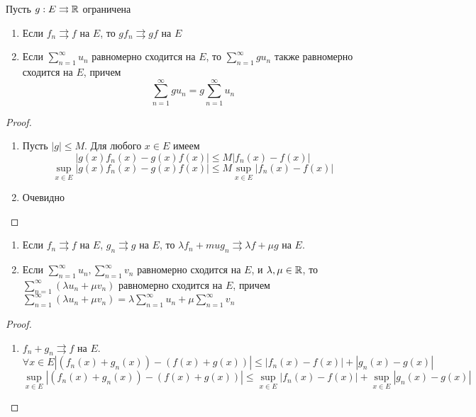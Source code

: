 \begin{proposition}
  Пусть \(g: E \rightrightarrows \mathbb{R}\) ограничена
  \begin{enumerate}
    \item Если  \(f_n \rightrightarrows f\) на \(E\), то \(gf_n \rightrightarrows gf\) на \(E\)
    \item Если \(\sum_{n = 1}^\infty u_n\) равномерно сходится на \(E\), то \(\sum_{n = 1}^\infty gu_n\) также равномерно сходится на \(E\), причем 
    \[\sum_{n = 1}^\infty gu_n = g\sum_{n = 1}^\infty u_n\]
  \end{enumerate}
\end{proposition}
\begin{proof}\indent
  \begin{enumerate}
    \item Пусть \(|g| \le M\). Для любого \(x \in E\) имеем
    \[|g(x)f_n(x) - g(x)f(x)| \le M|f_n(x) - f(x)|\]
    \[\sup_{x \in E}|g(x)f_n(x) - g(x)f(x)| \le M\sup_{x \in E}|f_n(x) - f(x)|\]
    \item Очевидно
  \end{enumerate}
\end{proof}
\begin{proposition}\indent
  \begin{enumerate}
    \item Если \(f_n \rightrightarrows f\) на \(E\), \(g_n \rightrightarrows g\) на \(E\), то \(\lambda f_n + 
    mu g_n \rightrightarrows \lambda f + \mu g\) на \(E\).
    \item Если \(\sum_{n = 1}^\infty u_n, \sum_{n = 1}^\infty v_n\) равномерно сходится на \(E\), и \(\lambda, \mu \in \mathbb{R}\), то \(\sum_{n = 1}^\infty (\lambda u_n + \mu v_n)\) равномерно сходится на \(E\), причем \(\sum_{n = 1}^\infty (\lambda u_n + \mu v_n) = \lambda \sum_{n = 1}^\infty u_n + \mu \sum_{n = 1}^\infty v_n\)
  \end{enumerate}  
\end{proposition}
\begin{proof}\indent
  \begin{enumerate}
    \item \(f_n + g_n \rightrightarrows f\) на \(E\).
    \[\forall x \in E |(f_n(x) + g_n(x)) - (f(x) + g(x))| \le |f_n(x) - f(x)| + |g_n(x) - g(x)|\]
    \[\sup_{x \in E} |(f_n(x) + g_n(x)) - (f(x) + g(x))| \le \sup_{x \in E}|f_n(x) - f(x)| + \sup_{x \in E}|g_n(x) - g(x)|\]
  \end{enumerate}
\end{proof}

